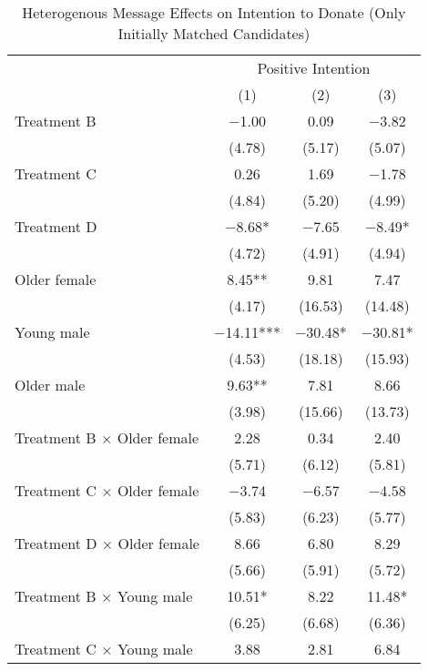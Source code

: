 \documentclass[12pt, a4paper]{article}
\begin{document}
\begin{table}[H]

\caption{\label{tab:lm-positive-interaction-init-reg}Heterogenous Message Effects on Intention to Donate (Only Initially Matched Candidates)}
\centering
\fontsize{8}{10}\selectfont
\begin{threeparttable}
\begin{tabular}[t]{lccc}
\toprule
\multicolumn{1}{c}{ } & \multicolumn{3}{c}{Positive Intention} \\
\cmidrule(l{3pt}r{3pt}){2-4}
  & (1) & (2) & (3)\\
\midrule
Treatment B & \num{-1.00} & \num{0.09} & \num{-3.82}\\
 & (\num{4.78}) & (\num{5.17}) & (\num{5.07})\\
Treatment C & \num{0.26} & \num{1.69} & \num{-1.78}\\
 & (\num{4.84}) & (\num{5.20}) & (\num{4.99})\\
Treatment D & \num{-8.68}* & \num{-7.65} & \num{-8.49}*\\
 & (\num{4.72}) & (\num{4.91}) & (\num{4.94})\\
Older female & \num{8.45}** & \num{9.81} & \num{7.47}\\
 & (\num{4.17}) & (\num{16.53}) & (\num{14.48})\\
Young male & \num{-14.11}*** & \num{-30.48}* & \num{-30.81}*\\
 & (\num{4.53}) & (\num{18.18}) & (\num{15.93})\\
Older male & \num{9.63}** & \num{7.81} & \num{8.66}\\
 & (\num{3.98}) & (\num{15.66}) & (\num{13.73})\\
Treatment B $\times$ Older female & \num{2.28} & \num{0.34} & \num{2.40}\\
 & (\num{5.71}) & (\num{6.12}) & (\num{5.81})\\
Treatment C $\times$ Older female & \num{-3.74} & \num{-6.57} & \num{-4.58}\\
 & (\num{5.83}) & (\num{6.23}) & (\num{5.77})\\
Treatment D $\times$ Older female & \num{8.66} & \num{6.80} & \num{8.29}\\
 & (\num{5.66}) & (\num{5.91}) & (\num{5.72})\\
Treatment B $\times$ Young male & \num{10.51}* & \num{8.22} & \num{11.48}*\\
 & (\num{6.25}) & (\num{6.68}) & (\num{6.36})\\
Treatment C $\times$ Young male & \num{3.88} & \num{2.81} & \num{6.84}\\

\end{tabular}
\end{threeparttable}
\end{table}
\end{document}
